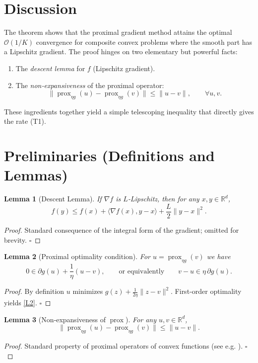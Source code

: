 \documentclass{article}
\newtheorem{lemma}{Lemma}
\newcommand{\prox}{\operatorname{prox}}
\newcommand{\grad}{\nabla}
\begin{document}
\section*{Discussion}
The theorem shows that the proximal gradient method attains the optimal $\mathcal{O}(1/K)$ convergence for composite convex problems where the smooth part has a Lipschitz gradient. The proof hinges on two elementary but powerful facts:
\begin{enumerate}
\item The \emph{descent lemma} for $f$ (Lipschitz gradient).
\item The \emph{non‑expansiveness} of the proximal operator:
\[
\|\prox_{\eta g}(u)-\prox_{\eta g}(v)\|\le\|u-v\|,\qquad\forall u,v.
\]
\end{enumerate}
These ingredients together yield a simple telescoping inequality that directly gives the rate (T1).

\newpage
\section*{Preliminaries (Definitions and Lemmas)}
\begin{lemma}[Descent Lemma]\label{lem:descent}
If $\grad f$ is $L$‑Lipschitz, then for any $x,y\in\mathbb{R}^{d}$,
\[
f(y)\le f(x)+\langle \grad f(x),y-x\rangle+\frac{L}{2}\|y-x\|^{2}.
\tag{L1}
\]
\end{lemma}
\begin{proof}
Standard consequence of the integral form of the gradient; omitted for brevity. \hfill $\square$
\end{proof}

\begin{lemma}[Proximal optimality condition]\label{lem:prox-opt}
For $u=\prox_{\eta g}(v)$ we have
\[
0\in \partial g(u)+\frac{1}{\eta}(u-v),
\qquad\text{or equivalently}\qquad
v-u\in\eta\,\partial g(u).
\tag{L2}
\]
\end{lemma}
\begin{proof}
By definition $u$ minimizes $g(z)+\frac{1}{2\eta}\|z-v\|^{2}$. First‑order optimality yields \eqref{L2}. \hfill $\square$
\end{proof}

\begin{lemma}[Non‑expansiveness of $\prox$]\label{lem:nonexp}
For any $u,v\in\mathbb{R}^{d}$,
\[
\|\prox_{\eta g}(u)-\prox_{\eta g}(v)\|\le\|u-v\|.
\tag{L3}
\]
\end{lemma}
\begin{proof}
Standard property of proximal operators of convex functions (see e.g. \cite{Parikh2014}). \hfill $\square$
\end{proof}
\end{document}
